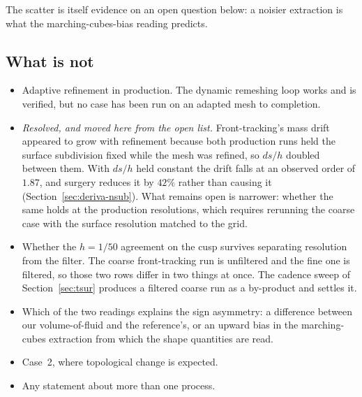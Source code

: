 The scatter is itself evidence on an open question below: a noisier extraction is
what the marching-cubes-bias reading predicts.

\subsection*{What is not}

\begin{itemize}
\item Adaptive refinement in production. The dynamic remeshing loop works and
is verified, but no case has been run on an adapted mesh to completion.
\item \emph{Resolved, and moved here from the open list.} Front-tracking's
mass drift appeared to grow with refinement because both production runs held
the surface subdivision fixed while the mesh was refined, so $ds/h$ doubled
between them. With $ds/h$ held constant the drift falls at an observed order of
$1.87$, and surgery reduces it by $42\%$ rather than causing it
(Section~\ref{sec:deriva-nsub}). What remains open is narrower: whether the
same holds at the production resolutions, which requires rerunning the coarse
case with the surface resolution matched to the grid.
\item Whether the $h=1/50$ agreement on the cusp survives separating resolution
from the filter. The coarse front-tracking run is unfiltered and the fine one is
filtered, so those two rows differ in two things at once. The cadence sweep of
Section~\ref{sec:tsur} produces a filtered coarse run as a by-product and
settles it.
\item Which of the two readings explains the sign asymmetry: a difference
between our volume-of-fluid and the reference's, or an upward bias in the
marching-cubes extraction from which the shape quantities are read.
\item Case~2, where topological change is expected.
\item Any statement about more than one process.
\end{itemize}
